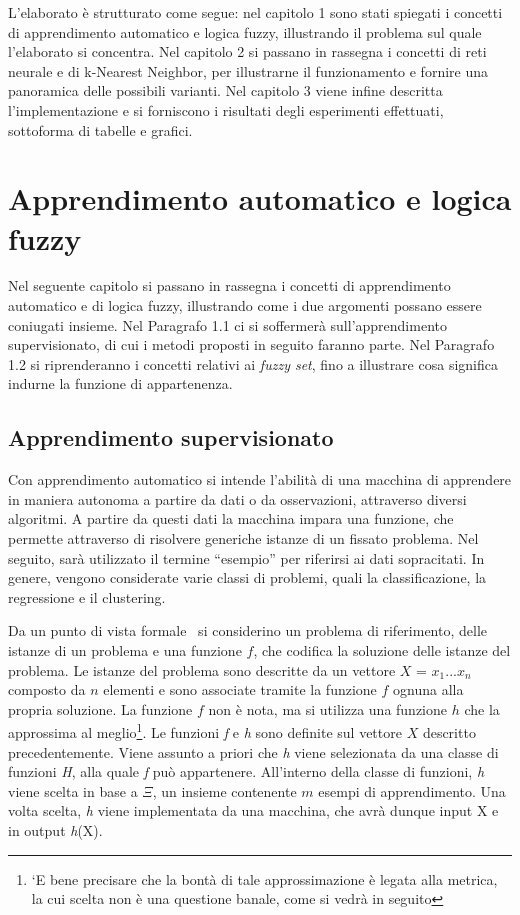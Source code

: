 \documentclass[11pt,  oneside, openany]{book}
\begin{document}
L'elaborato è strutturato come segue: nel capitolo 1 sono stati spiegati i concetti di apprendimento automatico e logica fuzzy, illustrando il problema sul quale l'elaborato si concentra. Nel capitolo 2 si passano in rassegna i concetti di reti neurale e di k-Nearest Neighbor, per illustrarne il funzionamento e fornire una panoramica delle possibili varianti. Nel capitolo 3 viene infine descritta l'implementazione e si forniscono i risultati degli esperimenti effettuati, sottoforma di tabelle e grafici. 

	\chapter{Apprendimento automatico e logica fuzzy}
Nel seguente capitolo si passano in rassegna i concetti di apprendimento automatico e di logica fuzzy, illustrando come i due argomenti possano essere coniugati insieme. Nel Paragrafo 1.1 ci si soffermerà sull'apprendimento supervisionato, di cui i metodi proposti in seguito faranno parte. Nel Paragrafo 1.2 si riprenderanno i concetti relativi ai \textit {fuzzy set}, fino a illustrare cosa significa indurne la funzione di appartenenza. 

	\section{Apprendimento supervisionato}

Con apprendimento automatico si intende l'abilità di una macchina di apprendere in maniera autonoma a partire da dati o da osservazioni, attraverso diversi algoritmi. A partire da questi dati la macchina impara una funzione, che permette attraverso di risolvere generiche istanze di un fissato problema. Nel seguito, sarà utilizzato il termine ``esempio'' per riferirsi ai dati sopracitati. In genere, vengono considerate varie classi di problemi, quali la classificazione, la regressione e il clustering. 

Da un punto di vista formale~\cite {mlstanford} si considerino un problema di riferimento, delle istanze di un problema e una funzione  $f$, che codifica la soluzione delle istanze del problema. Le istanze del problema sono descritte da un vettore  $X$ = $x_1...x_n$ composto da $n$ elementi e sono associate tramite la funzione $f$ ognuna alla propria soluzione. La funzione $f$ non è nota, ma si utilizza una funzione $h$ che la approssima al meglio\footnote{`E bene precisare che la bontà di tale approssimazione è legata alla metrica, la cui scelta non è una questione banale, come si vedrà in seguito}.  Le funzioni \textit {f} e \textit {h} sono definite sul vettore $X$ descritto precedentemente. Viene assunto a priori che \textit {h} viene selezionata da una classe di funzioni \textit {H}, alla quale \textit {f} può appartenere.  All'interno della classe di funzioni, \textit {h} viene scelta in base a $\Xi$, un insieme contenente $m$ esempi di apprendimento. Una volta scelta, \textit {h} viene implementata da una macchina, che avrà dunque input X e in output \textit {h}(X). 
\end{document}
